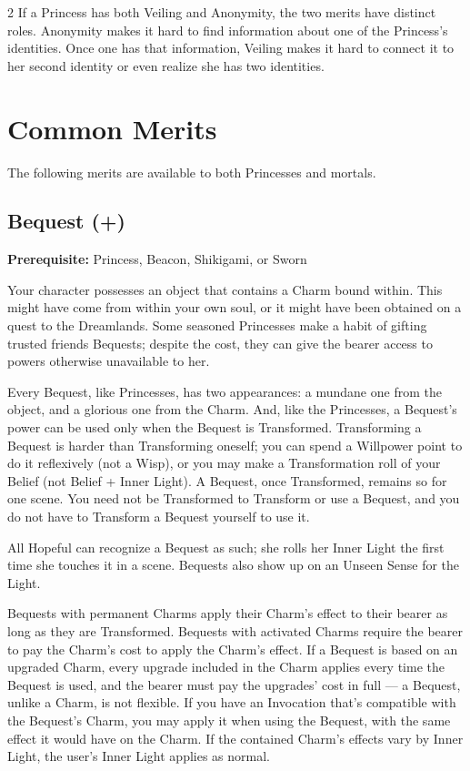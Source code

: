 \begin{multicols}{2}
If a Princess has both Veiling and Anonymity, the two merits have distinct roles. Anonymity makes it hard to find information about one of the Princess's identities. Once one has that information, Veiling makes it hard to connect it to her second identity or even realize she has two identities. 

\section*{Common Merits}
The following merits are available to both Princesses and mortals. 

\subsection*{Bequest (\textbullet +)}

\textbf{Prerequisite:} Princess, Beacon, Shikigami, or Sworn

Your character possesses an object that contains a Charm bound within. This might have come from within your own soul, or it might have been obtained on a quest to the Dreamlands. Some seasoned Princesses make a habit of gifting trusted friends Bequests; despite the cost, they can give the bearer access to powers otherwise unavailable to her. 

Every Bequest, like Princesses, has two appearances: a mundane one from the object, and a glorious one from the Charm. And, like the Princesses, a Bequest's power can be used only when the Bequest is Transformed. Transforming a Bequest is harder than Transforming oneself; you can spend a Willpower point to do it reflexively (not a Wisp), or you may make a Transformation roll of your Belief (not Belief + Inner Light). A Bequest, once Transformed, remains so for one scene. You need not be Transformed to Transform or use a Bequest, and you do not have to Transform a Bequest yourself to use it.

All Hopeful can recognize a Bequest as such; she rolls her Inner Light the first time she touches it in a scene. Bequests also show up on an Unseen Sense for the Light.

Bequests with permanent Charms apply their Charm's effect to their bearer as long as they are Transformed. Bequests with activated Charms require the bearer to pay the Charm's cost to apply the Charm's effect. If a Bequest is based on an upgraded Charm, every upgrade included in the Charm applies every time the Bequest is used, and the bearer must pay the upgrades' cost in full — a Bequest, unlike a Charm, is not flexible. If you have an Invocation that's compatible with the Bequest's Charm, you may apply it when using the Bequest, with the same effect it would have on the Charm. If the contained Charm's effects vary by Inner Light, the user's Inner Light applies as normal.


\end{multicols}
